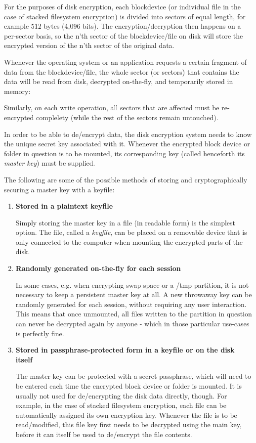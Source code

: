 For the purposes of disk encryption, each blockdevice (or individual file in the case of stacked filesystem encryption) is divided into sectors of equal length, for example 512 bytes (4,096 bits). The encryption/decryption then happens on a per-sector basis, so the n'th sector of the blockdevice/file on disk will store the encrypted version of the n'th sector of the original data.

Whenever the operating system or an application requests a certain fragment of data from the blockdevice/file, the whole sector (or sectors) that contains the data will be read from disk, decrypted on-the-fly, and temporarily stored in memory:

Similarly, on each write operation, all sectors that are affected must be re-encrypted complelety (while the rest of the sectors remain untouched).

In order to be able to de/encrypt data, the disk encryption system needs to know the unique secret key associated with it. Whenever the encrypted block device or folder in question is to be mounted, its corresponding key (called henceforth its \textit{master key}) must be supplied.

The following are some of the possible methods of storing and cryptographically securing a master key with a keyfile:
\begin{enumerate}
\item \textbf{Stored in a plaintext keyfile}

Simply storing the master key in a file (in readable form) is the simplest option. The file, called a \textit{keyfile}, can be placed on a removable device that is only connected to the computer when mounting the encrypted parts of the disk.

\item \textbf{Randomly generated on-the-fly for each session}

In some cases, e.g. when encrypting swap space or a /tmp partition, it is not necessary to keep a persistent master key at all. A new throwaway key can be randomly generated for each session, without requiring any user interaction. This means that once unmounted, all files written to the partition in question can never be decrypted again by anyone - which in those particular use-cases is perfectly fine.

\item \textbf{Stored in passphrase-protected form in a keyfile or on the disk itself}

The master key can be protected with a secret passphrase, which will need to be entered each time the encrypted block device or folder is mounted.
It is usually not used for de/encrypting the disk data directly, though. For example, in the case of stacked filesystem encryption, each file can be automatically assigned its own encryption key. Whenever the file is to be read/modified, this file key first needs to be decrypted using the main key, before it can itself be used to de/encrypt the file contents.

\end{enumerate}

